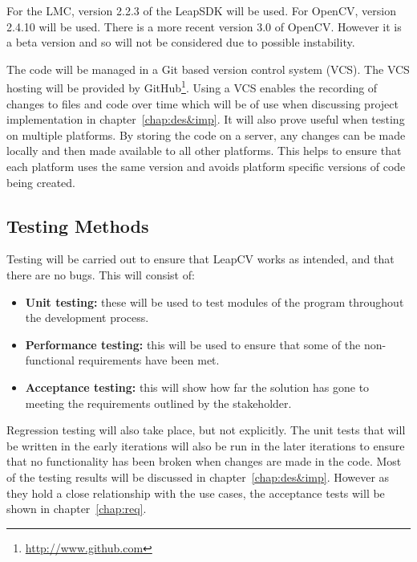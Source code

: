 \documentclass[11pt,oneside]{report}
\begin{document}
			For the LMC, version 2.2.3 of the LeapSDK will be used.
			For OpenCV, version 2.4.10 will be used.
			There is a more recent version 3.0 of OpenCV. However it is a beta version and so will not be considered due to possible instability.
			
			The code will be managed in a Git based version control system (VCS).
			The VCS hosting will be provided by GitHub\footnote{\url{http://www.github.com}}.
			Using a VCS enables the recording of changes to files and code over time which will be of use when discussing project implementation in chapter~\ref{chap:des&imp}.
			It will also prove useful when testing on multiple platforms.
			By storing the code on a server, any changes can be made locally and then made available to all other platforms.
			This helps to ensure that each platform uses the same version and avoids platform specific versions of code being created.
			\clearpage
			\subsection{Testing Methods}
				Testing will be carried out to ensure that LeapCV works as intended, and that there are no bugs.
				This will consist of:
				\begin{itemize}
					\item \textbf{Unit testing:} these will be used to test modules of the program throughout the development process.
					\item \textbf{Performance testing:} this will be used to ensure that some of the non-functional requirements have been met.
					\item \textbf{Acceptance testing:} this will show how far the solution has gone to meeting the requirements outlined by the stakeholder.
				\end{itemize}
				Regression testing will also take place, but not explicitly.
				The unit tests that will be written in the early iterations will also be run in the later iterations to ensure that no functionality has been broken when changes are made in the code.
				Most of the testing results will be discussed in chapter~\ref{chap:des&imp}. However as they hold a close relationship with the use cases, the acceptance tests will be shown in chapter~\ref{chap:req}.
				
\end{document}

